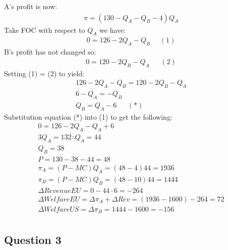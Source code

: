 \documentclass{article}
\begin{document}
A's profit is now:
\begin{gather*}
  \pi = (130 - Q_{A} - Q_{B} - 4) Q_{A}
\end{gather*}
Take FOC with respect to $Q_{A}$ we have:
\begin{gather*}
  0 = 126 - 2Q_{A} - Q_{B} \ \ \ \ \ \ (1)
\end{gather*}
B's profit has not changed so:
\begin{gather*}
  0 = 120 - 2Q_{B} - Q_{A} \ \ \ \  \ \ \ (2)
\end{gather*}
Setting (1) = (2) to yield:
\begin{gather*}
  126 - 2Q_{A} - Q_{B} = 120 - 2 Q_{B}  - Q_{A} \\
  6 - Q_{A} = - Q_{B} \\
  Q_{B} = Q_{A} - 6 \ \ \ \ \ \ \ (*)
\end{gather*}
Substitution equation (*) into (1) to get the following:
\begin{gather*}
  0 = 126 - 2Q_{A} - Q_{A} + 6 \\
  3Q_{A} = 132
  \therefore Q_{A} = 44 \\
  Q_{B} = 38 \\
  P = 130 - 38 - 44 = 48 \\
  \pi_{A} = (P - MC) Q_{A} = (48-4)44 = 1936 \\
  \pi_{B} = (P - MC)Q_{B} = (48-10)44 = 1444 \\
  \Delta Revenue EU = 0 - 44 \cdot 6 = -264 \\
  \Delta WelfareEU = \Delta \pi_{A} + \Delta Rev = (1936 - 1600) - 264 = 72 \\
  \Delta WelfareUS = \Delta \pi_{B} = 1444 - 1600 = -156 \\
\end{gather*}

\vspace{6mm}
\subsection{Question 3}
\end{document}
